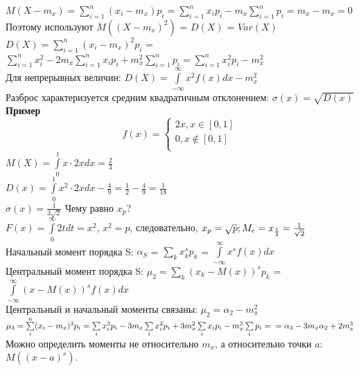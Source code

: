 \documentclass[russian, 12pt, fleqn]{article}
\begin{document}
$M(X - m_x) = \sum\limits_{i=1}^{n}(x_i-m_x)p_i=\sum\limits_{i=1}^{n}x_ip_i - m_x\sum\limits_{i=1}^{n}p_i = m_x - m_x = 0$\\
Поэтому используют $M((X-m_x)^2)$ = $D(X)$ = $Var(X)$\\
$D(X)= \sum\limits_{i=1}^{n} (x_i - m_x)^2p_i$ = $\sum\limits_{i=1}^{n}x_i^2 - 2m_x\sum\limits_{i=1}^{n}x_ip_i + m_x^2\sum\limits_{i=1}^{n}p_i = \sum\limits_{i=1}^{n}x_i^2p_i - m_x^2$\\
Для непрерывных величин: $D(X) = \int\limits_{-\infty}^{\infty}x^2f(x)dx - m_x^2$\\
Разброс характеризуется средним квадратичным отклонением: $\sigma(x) = \sqrt{D(x)}$\\
\textbf{Пример\ }\\
\begin{equation} 
f(x)=
 \begin{cases}
   2x,  x \in [0, 1]\\
   0 , x \notin [0, 1]\\
 \end{cases}
\end{equation}
$M(X) = \int\limits_{0}^{1}x\cdot 2x d x  = \frac{2}{3}$\\
$D(x) = \int\limits_{0}^{1}x^2\cdot 2x d x - \frac{4}{9} = \frac{1}{2} - \frac{4}{9} = \frac{1}{18}$\\
$\sigma(x) = \frac{1}{3\sqrt{2}}$
Чему равно $x_p$?\\
$F(x) = \int\limits_{0}^{\infty}2tdt = x^2$, $x^2 = p$, следовательно, $x_p = \sqrt{p};\\
 M_e = x_\frac{1}{2} = \frac{1}{\sqrt{2}}$\\
Начальный момент порядка S: $\alpha_S$ = $\sum\limits_{k} x^s_kp_k$  = $\int\limits_{-\infty}^{\infty}x^sf(x)dx$\\
Центральный момент порядка S:  $\mu_2 = \sum\limits_{k}^{}(x_k-M(x))^sp_k$  = $\int\limits_{-\infty}^{\infty}(x- M(x))^sf(x)dx$\\
Центральный и начальный моменты связаны: $\mu_2 = \alpha_2 - m_x^2$\\
$\mu_3 = \sum\limits_{i}^{n}(x_i-m_x)^3p_i =\sum\limits_{i}^{}x_i^3p_i - 3m_x\sum\limits_{i}^{ }x_i^2p_i + 3m_x^2\sum\limits_{i}^{ }x_ip_i - m_x^3\sum\limits_{i}^{ }p_i = \\
= \alpha_3 - 3 m_x \alpha_2  + 2m_x^3$\\
Можно определить моменты не относительно $m_x$, а относительно точки $a$:\\ $M((x-a)^s)$.\\
\end{document}
